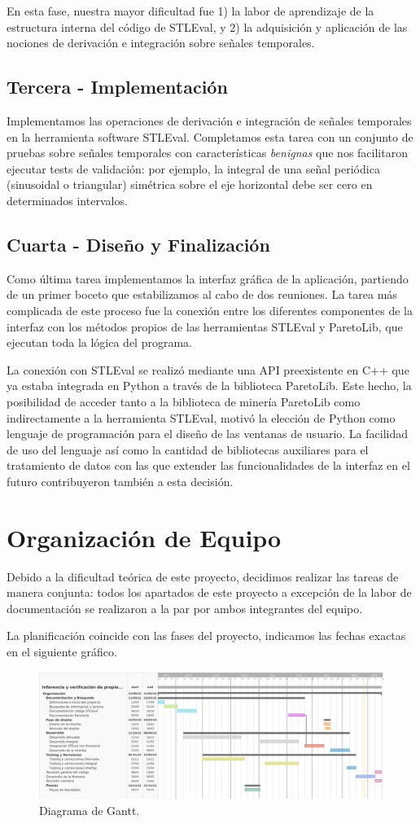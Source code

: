 	En esta fase, nuestra mayor dificultad fue 1) la labor de aprendizaje de la estructura interna del código de STLEval, y 2) la adquisición y aplicación de las nociones de derivación e integración sobre señales temporales.

\subsection{Tercera - Implementación}

	Implementamos las operaciones de derivación e integración de señales temporales en la herramienta software STLEval. Completamos esta tarea con un conjunto de pruebas sobre señales temporales con características \textit{benignas} que nos facilitaron ejecutar tests de validación: por ejemplo, la integral de una señal periódica (sinusoidal o triangular) simétrica sobre el eje horizontal debe ser cero en determinados intervalos.

\subsection{Cuarta - Diseño y Finalización}

	Como última tarea implementamos la interfaz gráfica de la aplicación, partiendo de un primer boceto que estabilizamos al cabo de dos reuniones. La tarea más complicada de este proceso fue la conexión entre los diferentes componentes de la interfaz con los métodos propios de las herramientas STLEval y ParetoLib, que ejecutan toda la lógica del programa.
	
	La conexión con STLEval se realizó mediante una API preexistente en C++ que ya estaba integrada en Python a través de la biblioteca ParetoLib. Este hecho, la posibilidad de acceder tanto a la biblioteca de minería ParetoLib como indirectamente a la herramienta STLEval, motivó la elección de Python como lenguaje de programación para el diseño de las ventanas de usuario. La facilidad de uso del lenguaje así como la cantidad de bibliotecas auxiliares para el tratamiento de datos con las que extender las funcionalidades de la interfaz en el futuro contribuyeron también a esta decisión.
	


\section{Organización de Equipo}

Debido a la dificultad teórica de este proyecto, decidimos realizar las tareas de manera conjunta: todos los apartados de este proyecto a excepción de la labor de documentación se realizaron a la par por ambos integrantes del equipo. 

La planificación coincide con las fases del proyecto, indicamos las fechas exactas en el siguiente gráfico.

\begin{figure}
\centering
  \includegraphics[width=.9\linewidth ,angle = 90,scale = 1.2]{images/gant}
\caption{Diagrama de Gantt.}
\label{fig:gant}
\end{figure}
